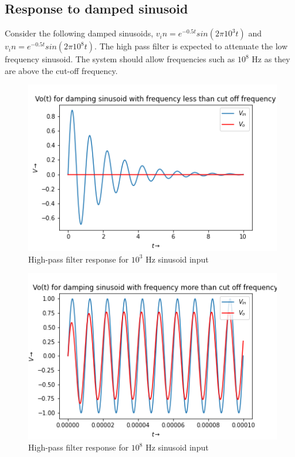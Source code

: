 \documentclass[11pt, a4paper]{article}
\begin{document}
   \subsection{Response to damped sinusoid}
   Consider the following damped sinusoids, $v_in = e^{-0.5t}sin(2 \pi 10^3t)$ and $v_in = e^{-0.5t}sin(2 \pi 10^8t)$.
   \newline
   The high pass filter is expected to attenuate the low frequency sinusoid.
The system should allow frequencies such as $10^8$ Hz as they are above the
cut-off frequency.
\begin{figure}[!tbh]
   	\centering
   	\includegraphics[scale=0.7]{damp_l.png}  %
   	\caption{High-pass filter response for $10^3$ Hz sinusoid input}
   	\label{fig:sample}
   \end{figure}
  \begin{figure}[!tbh]
   	\centering
   	\includegraphics[scale=0.7]{damp_h.png}  %
   	\caption{High-pass filter response for $10^8$ Hz sinusoid input}
   	\label{fig:sample}
   \end{figure}
   \newpage
\end{document}
